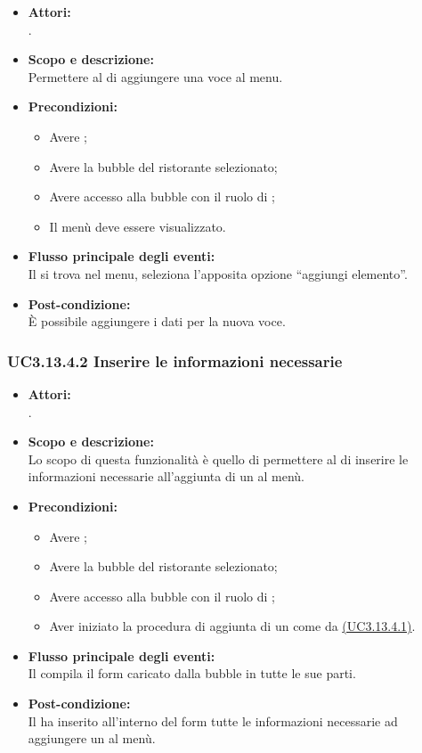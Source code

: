 \begin{itemize}
	\item \textbf{Attori:}
	\\.
	\item \textbf{Scopo e descrizione:} 
	\\Permettere al  di aggiungere una voce al menu.
	\item \textbf{Precondizioni:}
	\begin{itemize}
		\item Avere ;
		\item Avere la bubble del ristorante selezionato;
		\item Avere accesso alla bubble con il ruolo di ;
		\item Il menù deve essere visualizzato.
	\end{itemize}
	\item \textbf{Flusso principale degli eventi:}
	\\Il {} si trova nel menu, seleziona l’apposita opzione “aggiungi elemento”.
	\item \textbf{Post-condizione:}
	\\È possibile aggiungere i dati per la nuova voce.
\end{itemize}

\subsubsection{UC3.13.4.2 Inserire le informazioni necessarie} \label{UC3.13.4.2}

\begin{itemize}
	\item \textbf{Attori:}
	\\.
	\item \textbf{Scopo e descrizione:} 
	\\Lo scopo di questa funzionalità è quello di permettere al  di inserire le informazioni necessarie all’aggiunta di un  al menù.
	\item \textbf{Precondizioni:}
	\begin{itemize}
		\item Avere ;
		\item Avere la bubble del ristorante selezionato;
		\item Avere accesso alla bubble con il ruolo di ;
		\item Aver iniziato la procedura di aggiunta di un  come da \hyperref[UC3.13.4.1]{(UC3.13.4.1)}.
	\end{itemize}
	\item \textbf{Flusso principale degli eventi:}
	\\Il {} compila il form caricato dalla bubble in tutte le sue parti.
	\item \textbf{Post-condizione:}
	\\Il {} ha inserito all’interno del form tutte le informazioni necessarie ad aggiungere un  al menù.
\end{itemize}

